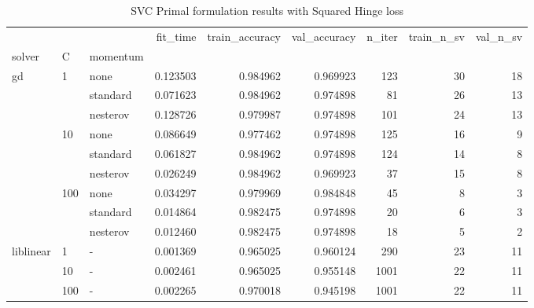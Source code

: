 \begin{table}[h!]
\centering
\caption{SVC Primal formulation results with Squared Hinge loss}
\label{primal_svc_squared_hinge_cv_results}
\begin{tabular}{lllrrrrrr}
\toprule
          &     &   &  fit\_time &  train\_accuracy &  val\_accuracy &  n\_iter &  train\_n\_sv &  val\_n\_sv \\
solver & C & momentum &           &                 &               &         &             &           \\
\midrule
gd & 1   & none &  0.123503 &        0.984962 &      0.969923 &     123 &          30 &        18 \\
          &     & standard &  0.071623 &        0.984962 &      0.974898 &      81 &          26 &        13 \\
          &     & nesterov &  0.128726 &        0.979987 &      0.974898 &     101 &          24 &        13 \\
          & 10  & none &  0.086649 &        0.977462 &      0.974898 &     125 &          16 &         9 \\
          &     & standard &  0.061827 &        0.984962 &      0.974898 &     124 &          14 &         8 \\
          &     & nesterov &  0.026249 &        0.984962 &      0.969923 &      37 &          15 &         8 \\
          & 100 & none &  0.034297 &        0.979969 &      0.984848 &      45 &           8 &         3 \\
          &     & standard &  0.014864 &        0.982475 &      0.974898 &      20 &           6 &         3 \\
          &     & nesterov &  0.012460 &        0.982475 &      0.974898 &      18 &           5 &         2 \\
liblinear & 1   & - &  0.001369 &        0.965025 &      0.960124 &     290 &          23 &        11 \\
          & 10  & - &  0.002461 &        0.965025 &      0.955148 &    1001 &          22 &        11 \\
          & 100 & - &  0.002265 &        0.970018 &      0.945198 &    1001 &          22 &        11 \\
\bottomrule
\end{tabular}
\end{table}
